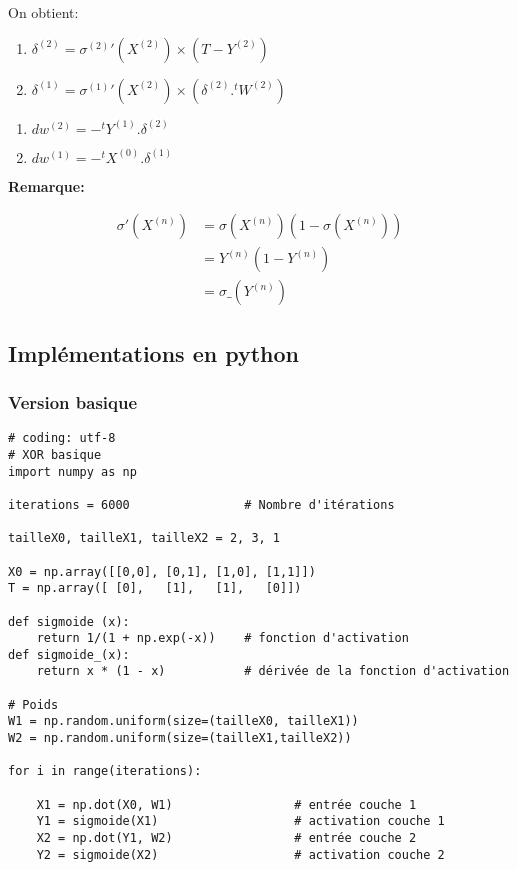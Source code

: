 \documentclass[11pt]{article}
\begin{document}
{On obtient:

\begin{enumerate}
\item $\delta^{(2)}=\sigma^{(2)}'(X^{(2)})\times(T-Y^{(2)})$
\item $\delta^{(1)}=\sigma^{(1)}'(X^{(2)})\times (\delta^{(2)}.^{t}W^{(2)})$
\end{enumerate}


\begin{enumerate}
\item $dw^{(2)}=-^{t}Y^{(1)}.\delta^{(2)}$
\item $dw^{(1)}=-^{t}X^{(0)}.\delta^{(1)}$
\end{enumerate}


\textbf{Remarque:}

\begin{align}
\sigma'(X^{(n)}) & = \sigma(X^{(n)})(1-\sigma(X^{(n)}))\\
                     & = Y^{(n)}(1-Y^{(n)})\\
                     & = \sigma\_(Y^{(n)})
\end{align}

\subsection{Implémentations en python}
\label{sec-6-2}

\subsubsection{Version basique}
\label{sec-6-2-1}

\begin{verbatim}
# coding: utf-8
# XOR basique
import numpy as np

iterations = 6000                # Nombre d'itérations

tailleX0, tailleX1, tailleX2 = 2, 3, 1

X0 = np.array([[0,0], [0,1], [1,0], [1,1]])
T = np.array([ [0],   [1],   [1],   [0]])

def sigmoide (x):
    return 1/(1 + np.exp(-x))    # fonction d'activation
def sigmoide_(x):
    return x * (1 - x)           # dérivée de la fonction d'activation

# Poids
W1 = np.random.uniform(size=(tailleX0, tailleX1))
W2 = np.random.uniform(size=(tailleX1,tailleX2))

for i in range(iterations):

    X1 = np.dot(X0, W1)                 # entrée couche 1
    Y1 = sigmoide(X1)                   # activation couche 1
    X2 = np.dot(Y1, W2)                 # entrée couche 2
    Y2 = sigmoide(X2)                   # activation couche 2


\end{verbatim}}
\end{document}
